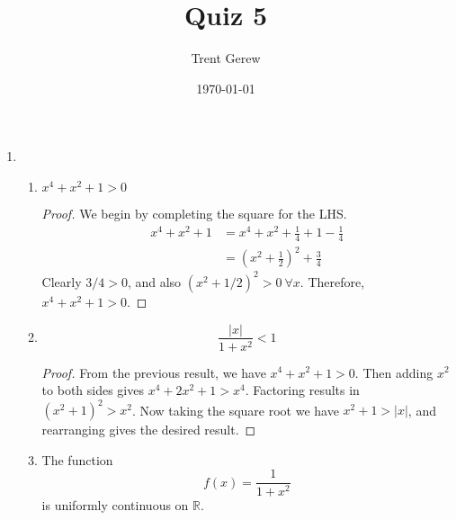 \documentclass[11pt]{amsart}
\date{\today}%
\newcommand{\R}{{\mathbb{R}}}
\theoremstyle{definition}
\begin{document}
\title{Quiz 5}
\author{Trent Gerew}

\maketitle

\begin{enumerate}
	\item 
		\begin{enumerate}
			\item
				$x^4 + x^2 + 1 > 0$
				\begin{proof}
					We begin by completing the square for the LHS.
					\begin{align*}
						x^4+ x^2 + 1 &= x^4 + x^2 + \frac{1}{4} + 1 - \frac{1}{4} \\
						&= \left( x^2 + \frac{1}{2} \right)^2 + \frac{3}{4}
					\end{align*}
					Clearly $3/4 > 0$, and also $\left( x^2 + 1/2 \right)^2 > 0 \ \forall x$.
					Therefore, $x^4 + x^2 + 1 > 0$.
				\end{proof}
			
			\item
				$$\frac{|x|}{1 + x^2} < 1$$
				\begin{proof}
					From the previous result, we have  $x^4 + x^2 + 1 > 0$.
					Then adding $x^2$ to both sides gives $x^4 + 2 x^2 + 1 > x^4$.
					Factoring results in $\left( x^2 + 1 \right)^2 > x^2$.
					Now taking the square root we have $x^2 + 1 > |x|$, and rearranging gives the desired result.
				\end{proof}
			
			\item
				The function
				$$f(x) = \frac{1}{1 + x^2}$$
				is uniformly continuous on $\R$.
		\end{enumerate}
		
\end{enumerate}
\end{document}
